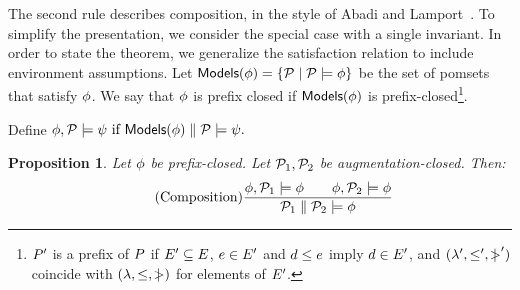 \documentclass[conference]{IEEEtran}
\theoremstyle{plain}
\newtheorem{proposition}[theorem]{Proposition}
\theoremstyle{definition}
\begin{document}
The second rule describes composition, in the style of Abadi and
Lamport~\cite{Abadi:1993:CS:151646.151649}.  To simplify the presentation, we
consider the special case with a single invariant.
In order to state the theorem, we generalize the satisfaction relation to
include environment assumptions.  Let
\begin{math}
  \textsf{Models}{(\phi)} = \{ \mathcal{P} \mid \mathcal{P} \models \phi \}
\end{math}
be the set of pomsets that satisfy $\phi$.  We say that $\phi$ is prefix
closed if $\textsf{Models}{(\phi)}$ is prefix-closed\footnote{$P'$ is a prefix of
  $P$ if $E'\subseteq E$, $e\in E'$ and $ d\le e$
  imply $d\in E'$, and $(\lambda',\leq',\mathrel{\,\mid\!\!\!>}')$ coincide with
  $(\lambda,\leq,\mathrel{\,\mid\!\!\!>})$ for elements of $E'$.}.
\begin{noenv}
  Define
  \begin{math}
    \phi, \mathcal{P} \models \psi  \text{ if } \textsf{Models}{(\phi)} \parallel \mathcal{P} \models \psi.
  \end{math}
\end{noenv}
\begin{proposition}%
  Let $\phi$ be prefix-closed.  Let $\mathcal{P}_1, \mathcal{P}_2$ be
  augmentation-closed.%
  Then:
  \begin{displaymath}
    \tag{Composition}
    \frac{
      \phi, \mathcal{P}_1 \models\phi
      \qquad
      \phi, \mathcal{P}_2 \models\phi
    }{\mathcal{P}_1 \parallel \mathcal{P}_2 \models \phi}
  \end{displaymath}
\end{proposition}
\end{document}
